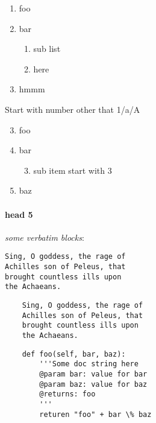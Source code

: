 \begin{enumerate}[1]
\item foo
\item bar
	\begin{enumerate}[a]
	\item sub list
	\item here
	\end{enumerate}
\item hmmm
\end{enumerate}




Start with number other that 1/a/A



\begin{enumerate}[A]
\setcounter{enumi}{2}
\item foo
\item bar
	\begin{enumerate}[1]
	\setcounter{enumi}{2}
	\item sub item start with 3
	\end{enumerate}
\item baz
\end{enumerate}


\paragraph{head 5}

\emph{some verbatim blocks}:




\begin{lstlisting}
Sing, O goddess, the rage of
Achilles son of Peleus, that
brought countless ills upon
the Achaeans.

\end{lstlisting}



\begin{lstlisting}
    Sing, O goddess, the rage of
    Achilles son of Peleus, that
    brought countless ills upon
    the Achaeans.

\end{lstlisting}



\begin{lstlisting}
    def foo(self, bar, baz):
    	'''Some doc string here
    	@param bar: value for bar
    	@param baz: value for baz
    	@returns: foo
    	'''
    	returen "foo" + bar \% baz

\end{lstlisting}


